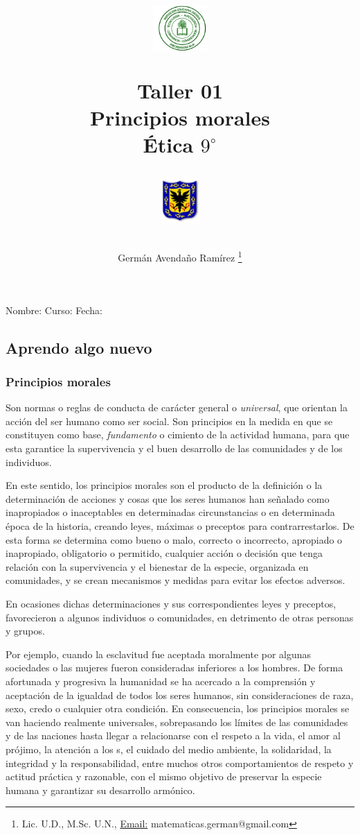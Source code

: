 \documentclass[10pt,twoside]{article}
\author{Germ\'an Avenda\~no Ram\'irez \thanks{Lic. U.D., M.Sc. U.N., \underline{Email:} matematicas.german@gmail.com}}
\title{\begin{minipage}{.2\textwidth}
\includegraphics[height=1.75cm]{Images/logo-colegio.png}\end{minipage}
\begin{minipage}{.55\textwidth}
\begin{center}
Taller 01\\
Principios morales\\
\'{E}tica $9^{\circ}$
\end{center}
\end{minipage}\hfill
\begin{minipage}{.2\textwidth}
\includegraphics[height=1.75cm]{Images/logo-sed.png} 
\end{minipage}}
\date{}
\begin{document}
\maketitle
Nombre: \hrulefill Curso: \underline{\hspace*{44pt}} Fecha: \underline{\hspace*{2.5cm}}
\subsection{Aprendo algo nuevo}
\subsubsection*{Principios morales}
Son normas o reglas de conducta de carácter general o \emph{universal}, que orientan la acción del ser humano como ser social. Son principios en la medida en que se constituyen como base, \emph{fundamento} o cimiento de la actividad humana, para que esta garantice la supervivencia y el buen desarrollo de las comunidades y de los individuos.

En este sentido, los principios morales son el producto de la definición o la determinación de acciones y cosas que los seres humanos han señalado como inapropiados o inaceptables en determinadas circunstancias o en determinada época de la historia, creando leyes, máximas o preceptos para contrarrestarlos. De esta forma se determina como bueno o malo, correcto o incorrecto, apropiado o inapropiado, obligatorio o permitido, cualquier acción o decisión que tenga relación con la supervivencia y el bienestar de la especie, organizada en comunidades, y se crean mecanismos y medidas para evitar los efectos adversos.

En ocasiones dichas determinaciones y sus correspondientes leyes y preceptos, favorecieron a algunos individuos o comunidades, en detrimento de otras personas y grupos.

Por ejemplo, cuando la esclavitud fue aceptada moralmente por algunas sociedades o las mujeres fueron consideradas inferiores a los hombres. De forma afortunada y progresiva la humanidad se ha acercado a la comprensión y aceptación de la igualdad de todos los seres humanos, sin consideraciones de raza, sexo, credo o cualquier otra condición. En consecuencia, los principios morales se van haciendo realmente universales, sobrepasando los límites de las comunidades y de las naciones hasta llegar a relacionarse con el respeto a la vida, el amor al prójimo, la atención a los s, el cuidado del medio ambiente, la solidaridad, la integridad y la responsabilidad, entre muchos otros comportamientos de respeto y actitud práctica y razonable, con el mismo objetivo de preservar la especie humana y garantizar su desarrollo armónico.
\end{document}
